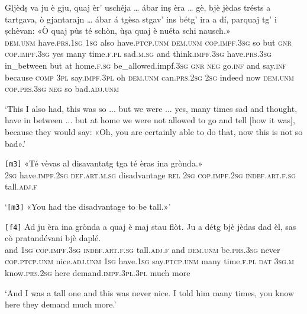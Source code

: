 \begin{linenumbers}
	\gll Gljèdṣ va ju è gju, quaj èr’ uschéja … ábar inṣ èra … gè,  bjè jèdas trésts a tartgava, ò gjantarajn … ábar á tgèsa stgav’ ins bétg’ ira a dí, parquaj tg’ i ṣchèvan: «Ò quaj pùs té schòn, ùṣa quaj è nuéta schi nausch.»\\
	\textsc{dem.unm} have.\textsc{prs.1sg} \textsc{1sg} also have.\textsc{ptcp.unm} \textsc{dem.unm} \textsc{cop.impf.3sg} so {} but \textsc{gnr} \textsc{cop.impf.3sg} {} yes many time.\textsc{f.pl} sad.\textsc{m.sg} and think.\textsc{impf.3sg} have.\textsc{prs.3sg} in\_between {} but at home.\textsc{f.sg} be\_allowed.impf.\textsc{3sg} \textsc{gnr} \textsc{neg} go.\textsc{inf} and say.\textsc{inf} because \textsc{comp} \textsc{3pl} say.\textsc{impf.3pl} oh \textsc{dem.unm} can.\textsc{prs.2sg} \textsc{2sg} indeed now \textsc{dem.unm} \textsc{cop.prs.3sg} \textsc{neg} so bad.\textsc{adj.unm}\\
\end{linenumbers}
\medskip
\glt `This I also had, this was so ... but we were ... yes, many times sad and thought, have in between ... but at home we were not allowed to go and tell [how it was], because they would say: «Oh, you are certainly able to do that, now this is not so bad».'
\medskip

\begin{linenumbers}
	\gll  \texttt{[m3]} «Té vèvas al disavantatg tga té èras ina grònda.» \\
	{} \textsc{2sg} have.\textsc{impf.2sg} \textsc{def.art.m.sg} disadvantage \textsc{rel} \textsc{2sg} \textsc{cop.impf.2sg} \textsc{indef.art.f.sg} tall.\textsc{adj.f} \\
\end{linenumbers}
\medskip
\glt `\texttt{[m3]} «You had the disadvantage to be tall.»'
\medskip

\begin{linenumbers}
	\gll \texttt{[f4]} Ad ju èra ina grònda a quaj è maj stau flòt. Ju a détg bjè jèdas dad èl, sas cò pratandévani bjè daplé.\\
{} and \textsc{1sg} \textsc{cop.impf.3sg} \textsc{indef.art.f.sg} tall.\textsc{adj.f} and \textsc{dem.unm} be.\textsc{prs.3sg} never \textsc{cop.ptcp.unm} nice.\textsc{adj.unm} \textsc{1sg} have.\textsc{1sg} say.\textsc{ptcp.unm} many time.\textsc{f.pl} \textsc{dat} \textsc{3sg.m} know.\textsc{prs.2sg} here demand.\textsc{impf.3pl.3pl} much more\\
\end{linenumbers}
\medskip
\glt `And I was a tall one and this was never nice. I told him many times, you know here they demand much more.'
\medskip

